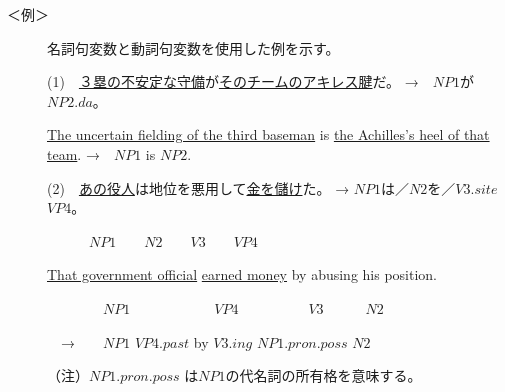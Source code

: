 \documentclass{nlp}
\begin{document}
\begin{description}
\item[＜例＞]名詞句変数と動詞句変数を使用した例を示す。

(1)　\underline{３塁の不安定な守備}が\underline{そのチームのアキレス腱}だ。 →　$NP1$が$NP2.da$。

\underline{The uncertain fielding of the third baseman} is \underline{the Achilles's heel of that team}.  →　$NP1$ is  $NP2$.


(2)　\underline{あの役人}は地位を悪用して\underline{金を儲け}た。 →    $NP1$は／$N2$を／$V3.site$ $VP4$。

　　　$NP1$　　$N2$　　$V3$　　$VP4$

\underline{That government official} \underline{earned money} by abusing his position.

　　　　$NP1$　　　　　　$VP4$　　　　　$V3$　　　$N2$

 　→　　$NP1$ $VP4.past$ by $V3.ing$ $NP1.pron.poss$ $N2$

（注）$NP1.pron.poss$  は$NP1$の代名詞の所有格を意味する。
\end{description}
       
\end{document}
